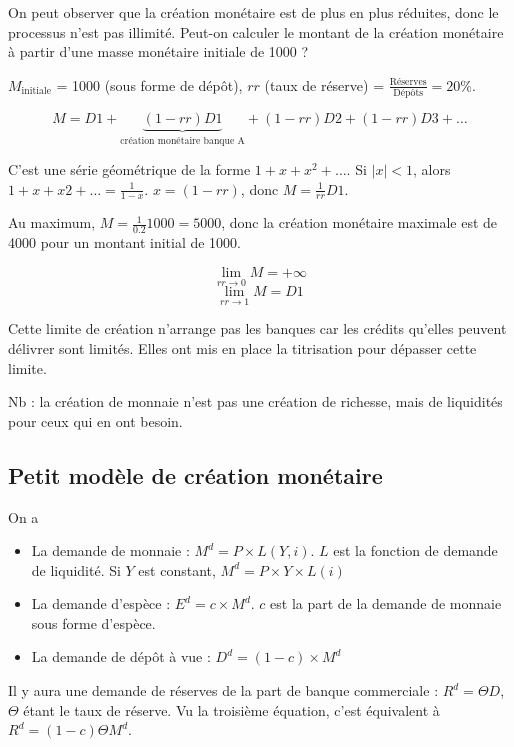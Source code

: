 	On peut observer que la création monétaire est de plus en plus réduites, donc le processus n'est pas illimité. Peut-on calculer le montant de la création monétaire à partir d'une masse monétaire initiale de 1000 ?
	
	$M_{\text{initiale}}$ = 1000 (sous forme de dépôt), $rr$ (taux de réserve) = $\frac{\text{Réserves}}{\text{Dépôts}} = 20\%$.
	
	$$M = D1 + \underbrace{(1 - rr) D1}_{\text{création monétaire banque A}} + (1 - rr) D2 + (1 - rr) D3 + \dots$$
		
	C'est une série géométrique de la forme $1 + x + x^2 + \dots$. Si $\vert x \vert < 1$, alors $1 + x + x2 + \dots = \frac{1}{1 - x}$. $x = (1 - rr)$, donc $M = \frac{1}{rr} D1$.
	
	Au maximum, $M = \frac{1}{0.2} 1000 = 5000$, donc la création monétaire maximale est de 4000 pour un montant initial de 1000.
	
	$$\lim_{rr \rightarrow 0} M = + \infty$$
	$$\lim_{rr \rightarrow 1} M = D1$$
	
	Cette limite de création n'arrange pas les banques car les crédits qu'elles peuvent délivrer sont limités. Elles ont mis en place la titrisation pour dépasser cette limite.
	
	Nb : la création de monnaie n'est pas une création de richesse, mais de liquidités pour ceux qui en ont besoin.
	
	\subsection{Petit modèle de création monétaire}
	
	
	On a
	\begin{itemize}
		\item La demande de monnaie : $ M^d = P\times L (Y, i)$. $L$ est la fonction de demande de liquidité. Si $Y$ est constant, $M^d = P\times Y\times L(i)$
	
		\item La demande d'espèce : $E^d = c \times M^d$. $c$ est la part de la demande de monnaie sous forme d'espèce.
	
		\item La demande de dépôt à vue : $D^d = (1 - c)\times   M^d$
	\end{itemize}
	
	Il y aura une demande de réserves de la part de banque commerciale : $R^d = \Theta D$, $\Theta$ étant le taux de réserve. Vu la troisième équation, c'est équivalent à $R^d = (1 - c)\Theta M^d$.
	
